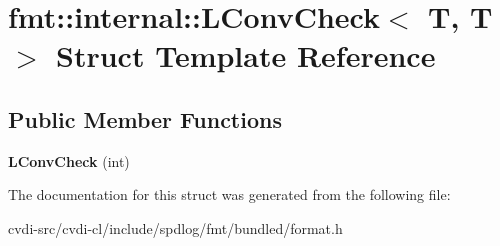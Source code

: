\hypertarget{structfmt_1_1internal_1_1LConvCheck}{}\section{fmt\+:\+:internal\+:\+:L\+Conv\+Check$<$ T, T $>$ Struct Template Reference}
\label{structfmt_1_1internal_1_1LConvCheck}
\subsection*{Public Member Functions}
\begin{DoxyCompactItemize}
\item 
{\bfseries L\+Conv\+Check} (int)\hypertarget{structfmt_1_1internal_1_1LConvCheck_af5a35a7bced670df56dcef11f37d1427}{}\label{structfmt_1_1internal_1_1LConvCheck_af5a35a7bced670df56dcef11f37d1427}

\end{DoxyCompactItemize}


The documentation for this struct was generated from the following file\+:\begin{DoxyCompactItemize}
\item 
cvdi-\/src/cvdi-\/cl/include/spdlog/fmt/bundled/format.\+h\end{DoxyCompactItemize}

